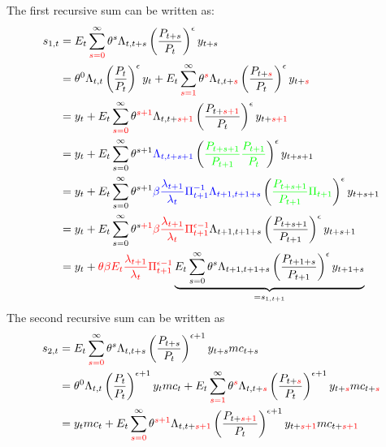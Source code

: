 \begin{enumerate}
The first recursive sum can be written as:
\begin{align*}
s_{1,t} &= 
E_t\sum^{\infty}_{\color{red}{s=0}}\theta^s \Lambda_{t,t+s} \left(\frac{P_{t+s}}{P_t}\right)^{\epsilon} y_{t+s}
\\
&= \theta^0 \Lambda_{t,t} \left(\frac{P_t}{P_t}\right)^\epsilon y_t + E_t\sum^{\infty}_{\color{red}{s=1}}\theta^{\color{red}{s}} \Lambda_{t,t+\color{red}{s}} \left(\frac{P_{t+\color{red}{s}}}{P_t}\right)^{\epsilon} y_{t+\color{red}{s}}
\\
&= y_t + E_t\sum^{\infty}_{\color{red}{s=0}}\theta^{\color{red}{s+1}} \Lambda_{t,t+\color{red}{s+1}} \left(\frac{P_{t+\color{red}{s+1}}}{P_t}\right)^{\epsilon} y_{t+\color{red}{s+1}}
\\
&= y_t + E_t\sum^{\infty}_{s=0}\theta^{s+1} {\color{blue}{\Lambda_{t,t+s+1}}} \left({\color{green}{\frac{P_{t+s+1}}{P_{t+1}}\frac{P_{t+1}}{P_{t}}}}\right)^{\epsilon} y_{t+s+1}
\\
&= y_t + E_t\sum^{\infty}_{s=0}\theta^{s+1} {\color{blue}{\beta \frac{\lambda_{t+1}}{\lambda_t}\Pi_{t+1}^{-1} \Lambda_{t+1,t+1+s}}} \left({\color{green}{\frac{P_{t+s+1}}{P_{t+1}}\Pi_{t+1}}}\right)^{\epsilon} y_{t+s+1}
\\
&= y_t + E_t\sum^{\infty}_{s=0}\theta^{s {\color{red}+1}} { {\color{red}\beta \frac{\lambda_{t+1}}{\lambda_t}\Pi_{t+1}^{\epsilon-1}} \Lambda_{t+1,t+1+s}} \left({\frac{P_{t+s+1}}{P_{t+1}}}\right)^{\epsilon} y_{t+s+1}
\\
&= y_t + {\color{red}\theta\beta E_t\frac{\lambda_{t+1}}{\lambda_t}\Pi_{t+1}^{\epsilon-1}} \underbrace{E_t\sum^{\infty}_{s=0}\theta^{s} \Lambda_{t+1,t+1+s} \left(\frac{P_{t+1+s}}{P_{t+1}}\right)^{\epsilon} y_{t+1+s}}_{=s_{1,t+1}}
\end{align*}
The second recursive sum can be written as
\begin{align*}
s_{2,t} &= 
E_t\sum_{{\color{red}s=0}}^{\infty}\theta^s \Lambda_{t,t+s} \left(\frac{P_{t+s}}{P_t}\right)^{\epsilon+1} y_{t+s} mc_{t+s}
\\
&= \theta^0 \Lambda_{t,t} \left(\frac{P_t}{P_t}\right)^{\epsilon+1} y_t mc_t + E_t\sum^{\infty}_{\color{red}{s=1}}\theta^{\color{red}{s}} \Lambda_{t,t+\color{red}{s}} \left(\frac{P_{t+\color{red}{s}}}{P_t}\right)^{\epsilon+1} y_{t+\color{red}{s}} mc_{t+\color{red}{s}}
\\
&= y_t mc_t + E_t\sum^{\infty}_{\color{red}{s=0}}\theta^{\color{red}{s+1}} \Lambda_{t,t+\color{red}{s+1}} \left(\frac{P_{t+\color{red}{s+1}}}{P_t}\right)^{\epsilon+1} y_{t+\color{red}{s+1}} mc_{t+\color{red}{s+1}}
\\

\end{align*}
\end{enumerate}
